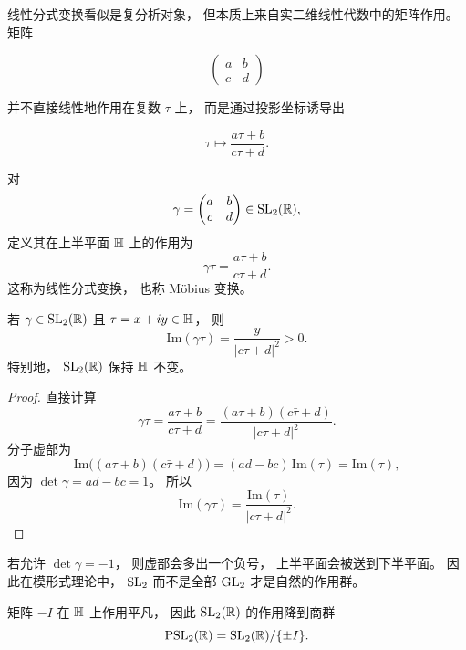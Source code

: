 线性分式变换看似是复分析对象， 但本质上来自实二维线性代数中的矩阵作用。 矩阵




\[ \begin{pmatrix} a&b\\ c&d \end{pmatrix} \]




并不直接线性地作用在复数 $\tau$ 上， 而是通过投影坐标诱导出




\[ \tau\longmapsto \frac{a\tau+b}{c\tau+d}. \]




\begin{definition}[Möbius 变换] 对 \[ \gamma= \begin{pmatrix} a&b\\ c&d \end{pmatrix}\in \mathrm{SL}_2(\mathbb{R}), \] 定义其在上半平面 $\mathbb{H}$ 上的作用为 \[ \gamma\tau=\frac{a\tau+b}{c\tau+d}. \] 这称为线性分式变换， 也称 Möbius 变换。 \end{definition}




\begin{proposition} 若 $\gamma\in\mathrm{SL}_2(\mathbb{R})$ 且 $\tau=x+iy\in\mathbb{H}$， 则 \[ \mathrm{Im}(\gamma\tau)=\frac{y}{|c\tau+d|^2}>0. \] 特别地， $\mathrm{SL}_2(\mathbb{R})$ 保持 $\mathbb{H}$ 不变。 \end{proposition}




\begin{proof} 直接计算 \[ \gamma\tau=\frac{a\tau+b}{c\tau+d} =\frac{(a\tau+b)(c\bar\tau+d)}{|c\tau+d|^2}. \] 分子虚部为 \[ \mathrm{Im}\bigl((a\tau+b)(c\bar\tau+d)\bigr) =(ad-bc)\,\mathrm{Im}(\tau) =\mathrm{Im}(\tau), \] 因为 $\det\gamma=ad-bc=1$。 所以 \[ \mathrm{Im}(\gamma\tau)=\frac{\mathrm{Im}(\tau)}{|c\tau+d|^2}. \] \end{proof}




\begin{remark} 若允许 $\det\gamma=-1$， 则虚部会多出一个负号， 上半平面会被送到下半平面。 因此在模形式理论中， $\mathrm{SL}_2$ 而不是全部 $\mathrm{GL}_2$ 才是自然的作用群。 \end{remark}




\begin{proposition} 矩阵 $-I$ 在 $\mathbb{H}$ 上作用平凡， 因此 $\mathrm{SL}_2(\mathbb{R})$ 的作用降到商群 \[ \mathrm{PSL}_2(\mathbb{R})=\mathrm{SL}_2(\mathbb{R})/\{\pm I\}. \] \end{proposition}




